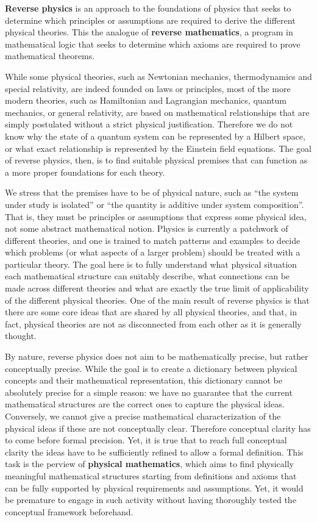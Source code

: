 \textbf{Reverse physics} is an approach to the foundations of physics that seeks to determine which principles or assumptions are required to derive the different physical theories. This the analogue of \textbf{reverse mathematics}, a program in mathematical logic that seeks to determine which axioms are required to prove mathematical theorems.

While some physical theories, such as Newtonian mechanics, thermodynamics and special relativity, are indeed founded on laws or principles, most of the more modern theories, such as Hamiltonian and Lagrangian mechanics, quantum mechanics, or general relativity, are based on mathematical relationships that are simply postulated without a strict physical justification. Therefore we do not know why the state of a quantum system can be represented by a Hilbert space, or what exact relationship is represented by the Einstein field equations. The goal of reverse physics, then, is to find suitable physical premises that can function as a more proper foundations for each theory.

We stress that the premises have to be of physical nature, such as ``the system under study is isolated'' or ``the quantity is additive under system composition''. That is, they must be principles or assumptions that express some physical idea, not some abstract mathematical notion. Physics is currently a patchwork of different theories, and one is trained to match patterns and examples to decide which problems (or what aspects of a larger problem) should be treated with a particular theory. The goal here is to fully understand what physical situation each mathematical structure can suitably describe, what connections can be made across different theories and what are exactly the true limit of applicability of the different physical theories. One of the main result of reverse physics is that there are some core ideas that are shared by all physical theories, and that, in fact, physical theories are not as disconnected from each other as it is generally thought.

By nature, reverse physics does not aim to be mathematically precise, but rather conceptually precise. While the goal is to create a dictionary between physical concepts and their mathematical representation, this dictionary cannot be absolutely precise for a simple reason: we have no guarantee that the current mathematical structures are the correct ones to capture the physical ideas. Conversely, we cannot give a precise mathematical characterization of the physical ideas if these are not conceptually clear. Therefore conceptual clarity has to come before formal precision. Yet, it is true that to reach full conceptual clarity the ideas have to be sufficiently refined to allow a formal definition. This task is the perview of \textbf{physical mathematics}, which aims to find physically meaningful mathematical structures starting from definitions and axioms that can be fully supported by physical requirements and assumptions. Yet, it would be premature to engage in such activity without having thoroughly tested the conceptual framework beforehand.
